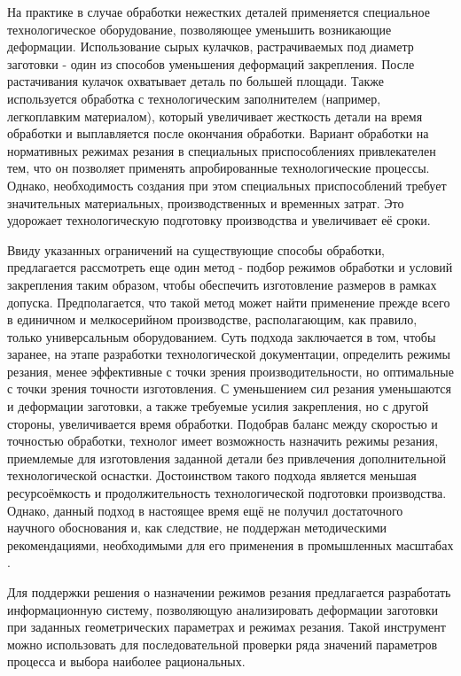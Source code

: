 \documentclass[14pt,oneside,final]{extreport}
\begin{document}
	На практике в случае обработки нежестких деталей применяется специальное технологическое оборудование, позволяющее уменьшить возникающие деформации. Использование сырых кулачков, растрачиваемых под диаметр заготовки - один из способов уменьшения деформаций закрепления. После растачивания кулачок охватывает деталь по большей площади. Также используется обработка с технологическим заполнителем (например, легкоплавким материалом), который увеличивает жесткость детали на время обработки и выплавляется после окончания обработки. Вариант обработки на нормативных режимах резания в специальных приспособлениях привлекателен тем, что он позволяет применять апробированные технологические процессы. Однако, необходимость создания при этом специальных приспособлений требует значительных материальных, производственных и временных затрат. Это удорожает технологическую подготовку производства и увеличивает её сроки. 

	Ввиду указанных ограничений на существующие способы обработки, предлагается рассмотреть еще один метод - подбор режимов обработки и условий закрепления таким образом, чтобы обеспечить изготовление размеров в рамках допуска. Предполагается, что такой метод может найти применение прежде всего в единичном и мелкосерийном производстве, располагающим, как правило, только универсальным оборудованием. Суть подхода заключается в том, чтобы заранее, на этапе разработки технологической документации, определить режимы резания, менее эффективные с точки зрения производительности, но оптимальные с точки зрения точности изготовления. С уменьшением сил резания уменьшаются и деформации заготовки, а также требуемые усилия закрепления, но с другой стороны, увеличивается время обработки.  Подобрав баланс между скоростью и точностью обработки, технолог имеет возможность назначить режимы резания, приемлемые для изготовления заданной детали без привлечения дополнительной технологической оснастки.  Достоинством такого подхода является меньшая ресурсоёмкость и продолжительность технологической подготовки производства. Однако, данный подход в настоящее время ещё не получил достаточного научного обоснования и, как следствие, не поддержан методическими рекомендациями, необходимыми для его применения в промышленных масштабах \cite{article:zhargalova}.
	
	Для поддержки решения о назначении режимов резания предлагается разработать информационную систему, позволяющую анализировать деформации заготовки при заданных геометрических параметрах и режимах резания. Такой инструмент можно использовать для последовательной проверки ряда значений параметров процесса и выбора наиболее рациональных. 
	
\end{document}
